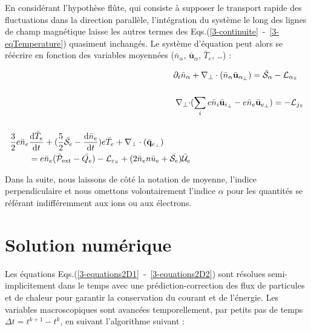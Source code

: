 \begin{refsection}
En considérant l'hypothèse flûte, qui
consiste à supposer le transport rapide des fluctuations dans la direction
parallèle, l'intégration du système le long des lignes de champ magnétique
laisse les autres termes des
Eqs.(\ref{3-continuite}~-~\ref{3-eqTemperature}) quasiment inchangés.
Le système d'équation peut alors se réécrire en fonction des variables moyennées
($\bar{n}_\alpha$, $\bar{\mathbf u}_\alpha$, $\bar{T}_e$, \ldots) :

\begin{align}
\label{3-equations2D1}
\partial_t \bar{n}_\alpha& +
\nabla_\perp\cdot\left(\bar{n}_\alpha\bar{\mathbf{u}}_{\alpha_\perp}\right)=\bar{\mathcal{S}}_\alpha
- \mathcal{L}_{\alpha_\para}\\[0.5cm]
\nabla_\perp\cdot&(\sum_ie\bar{n}_i\bar{\mathbf{u}}_{i_\perp}
-e\bar{n}_e\bar{\mathbf{u}}_{e_\perp})= - \mathcal{L}_{j_\para}\\[0.5cm]
\begin{split}\frac{3}{2}e\bar{n}_e&\frac{\text{d}\bar{T}_e}{\text{d}t} +
(\frac{5}{2}\bar{\mathcal{S}}_e
-\frac{\text{d}\bar{n}_e}{\text{d}t})e\bar{T}_e+\nabla_\perp\cdot(\bar{\mathbf{q}}_{e_\perp})\\
&=e\bar{n}_e(\bar{\mathcal{P}}_\text{ext}-\bar{Q_e})-\mathcal{L}_{\varepsilon_\para}
+(2\bar{n}_en\bar{u}_e+\bar{\mathcal{S}}_e)\bar{\mathcal{U}}_e
\label{3-equations2D2}
\end{split}
\end{align}

Dans la suite, nous laissons de côté la notation de moyenne, l'indice
perpendiculaire et nous omettons volontairement l'indice $\alpha$ pour les
quantités se référant indifféremment aux ions ou aux électrons.

\section{Solution numérique}

Les équations Eqs.(\ref{3-equations2D1}~-~\ref{3-equations2D2}) sont résolues
semi-implicitement dans le temps avec une prédiction-correction des flux de
particules et de chaleur pour garantir la conservation du courant et de
l'énergie. Les variables macroscopiques sont avancées temporellement, par
petits pas de temps $\Delta t=t^{k+1}-t^k$, en suivant l'algorithme suivant :


\end{refsection}
